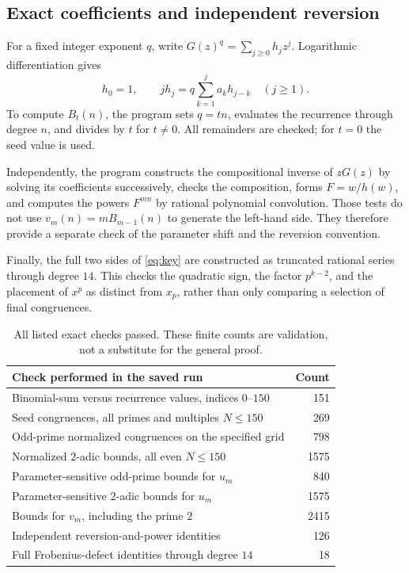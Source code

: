 \documentclass[11pt,letterpaper]{article}
\numberwithin{equation}{section}
\theoremstyle{definition}
\theoremstyle{remark}
\begin{document}
\subsection{Exact coefficients and independent reversion}
For a fixed integer exponent $q$, write $G(z)^q=\sum_{j\ge0}h_jz^j$.
Logarithmic differentiation gives
\begin{equation}\label{eq:coefficientrec}
 h_0=1,\qquad jh_j=q\sum_{k=1}^j a_kh_{j-k}\quad(j\ge1).
\end{equation}
To compute $B_t(n)$, the program sets $q=tn$, evaluates the recurrence
through degree $n$, and divides by $t$ for $t\ne0$. All remainders are
checked; for $t=0$ the seed value is used.

Independently, the program constructs the compositional inverse of $zG(z)$
by solving its coefficients successively, checks the composition, forms
$F=w/h(w)$, and computes the powers $F^{mn}$ by rational polynomial
convolution. Those tests do not use $v_m(n)=mB_{m-1}(n)$ to generate the
left-hand side. They therefore provide a separate check of the parameter
shift and the reversion convention.

Finally, the full two sides of \eqref{eq:key} are constructed as truncated
rational series through degree $14$. This checks the quadratic sign, the
factor $p^{k-2}$, and the placement of $x^p$ as distinct from $x_p$, rather
than only comparing a selection of final congruences.

\begin{table}[htbp]
\centering
\small
\begin{tabular}{p{}r}
\toprule
Check performed in the saved run & Count\\
\midrule
Binomial-sum versus recurrence values, indices $0$--$150$ & 151\\
Seed congruences, all primes and multiples $N\le150$ & 269\\
Odd-prime normalized congruences on the specified grid & 798\\
Normalized $2$-adic bounds, all even $N\le150$ & 1575\\
Parameter-sensitive odd-prime bounds for $u_m$ & 840\\
Parameter-sensitive $2$-adic bounds for $u_m$ & 1575\\
Bounds for $v_m$, including the prime $2$ & 2415\\
Independent reversion-and-power identities & 126\\
Full Frobenius-defect identities through degree $14$ & 18\\
\bottomrule
\end{tabular}
\caption{All listed exact checks passed. These finite counts are validation,
not a substitute for the general proof.}\label{tab:checks}
\end{table}
\end{document}
